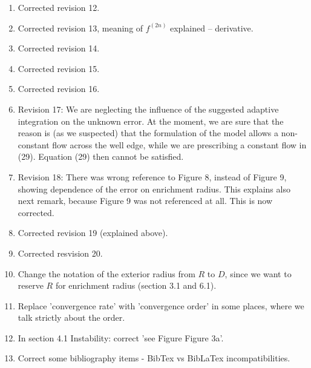 \documentclass[a4paper,11pt]{article}
\begin{document}
\begin{enumerate}
\item Corrected revision 12. %
\item Corrected revision 13, meaning of $f^{(2n)}$ explained -- derivative. %
\item Corrected revision 14. %
\item Corrected revision 15. %
\item Corrected revision 16. %

\item Revision 17: We are neglecting the influence of the suggested adaptive integration on the unknown error. 
      At the moment, we are sure that the reason is (as we suspected) that the formulation of the model allows a non-constant
      flow across the well edge, while we are prescribing a constant flow in (29). Equation (29) then cannot be satisfied. %

\item Revision 18: There was wrong reference to Figure 8, instead of Figure 9, showing dependence of the error on enrichment radius. %
      This explains also next remark, because Figure 9 was not referenced at all.
      This is now corrected. %
\item Corrected revision 19 (explained above). %
\item Corrected resvision 20. %

\item Change the notation of the exterior radius from $R$ to $D$, since we want to reserve $R$ for enrichment radius (section 3.1 and 6.1).
\item Replace 'convergence rate' with 'convergence order' in some places, where we talk strictly about the order.
\item In section 4.1 Instability: correct 'see Figure Figure 3a'.
\item Correct some bibliography items - BibTex vs BibLaTex incompatibilities.

\end{enumerate} 
\end{document}
